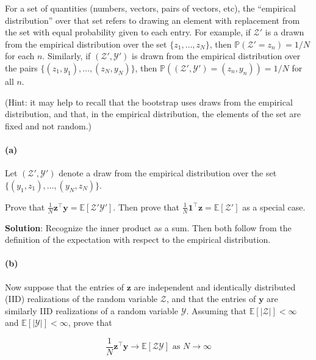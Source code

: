 \documentclass[
  letterpaper,
  DIV=11,
  numbers=noendperiod]{scrartcl}
\let\oldparagraph\paragraph
\renewcommand{\paragraph}[1]{\oldparagraph{#1}\mbox{}}
\begin{document}
For a set of quantities (numbers, vectors, pairs of vectors, etc), the
``empirical distribution'' over that set refers to drawing an element
with replacement from the set with equal probability given to each
entry. For example, if \(\mathcal{Z}'\) is a drawn from the empirical
distribution over the set \(\{z_1, \ldots, z_N \}\), then
\(\mathbb{P}\left(\mathcal{Z}' = z_n\right) = 1/N\) for each \(n\).
Similarly, if \((\mathcal{Z}', \mathcal{Y}')\) is drawn from the
empirical distribution over the pairs
\(\{(z_1, y_1), \ldots, (z_N, y_N)\}\), then
\(\mathbb{P}\left((\mathcal{Z}', \mathcal{Y}') = (z_n, y_n)\right) = 1/N\)
for all \(n\).

(Hint: it may help to recall that the bootstrap uses draws from the
empirical distribution, and that, in the empirical distribution, the
elements of the set are fixed and not random.)

\hypertarget{a-2}{%
\paragraph{(a)}\label{a-2}}

Let \((\mathcal{Z}', \mathcal{Y}')\) denote a draw from the empirical
distribution over the set \(\{(y_1, z_1), \ldots, (y_N, z_N)\}\).

Prove that
\(\frac{1}{N} \boldsymbol{z}^\intercal\boldsymbol{y}= \mathbb{E}\left[\mathcal{Z}' \mathcal{Y}'\right]\).
Then prove that
\(\frac{1}{N} \boldsymbol{1}^\intercal\boldsymbol{z}= \mathbb{E}\left[\mathcal{Z}'\right]\)
as a special case.

\textbf{Solution}: Recognize the inner product as a sum. Then both
follow from the definition of the expectation with respect to the
empirical distribution.

\hypertarget{b-2}{%
\paragraph{(b)}\label{b-2}}

Now suppose that the entries of \(\boldsymbol{z}\) are independent and
identically distributed (IID) realizations of the random variable
\(\mathcal{Z}\), and that the entries of \(\boldsymbol{y}\) are
similarly IID realizations of a random variable \(\mathcal{Y}\).
Assuming that \(\mathbb{E}\left[|\mathcal{Z}|\right] < \infty\) and
\(\mathbb{E}\left[|\mathcal{Y}|\right] < \infty\), prove that

\[
\frac{1}{N} \boldsymbol{z}^\intercal\boldsymbol{y}\rightarrow
    \mathbb{E}\left[\mathcal{Z} \mathcal{Y}\right]
    \textrm{ as }N \rightarrow \infty
\]
\end{document}
